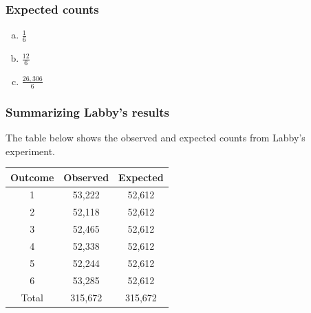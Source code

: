
\begin{frame}
\frametitle{Expected counts}


\begin{enumerate}[(a)]
\item $\frac{1}{6}$
\item $\frac{12}{6}$
\item $\frac{26,306}{6}$
 
\end{enumerate}

\end{frame}


\begin{frame}
\frametitle{Summarizing Labby's results}

The table below shows the observed and expected counts from Labby's experiment.

{\small
\begin{center}
\renewcommand\arraystretch{1.2}
\begin{tabular}{c | c c}
Outcome	& Observed	& Expected \\
\hline
1		& 53,222		& 52,612 \\
2		& 52,118		& 52,612 \\
3		& 52,465		& 52,612 \\
4		& 52,338		& 52,612 \\
5		& 52,244		& 52,612 \\
6		& 53,285		& 52,612 \\
\hline
Total		& 315,672		& 315,672
\end{tabular}
\end{center}
}

\pause
{}

\end{frame}


